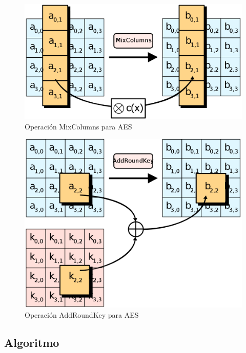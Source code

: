 \begin{figure}[ht]
  \centering
  \includegraphics[scale=0.25]{Figures/MixColumns}
  \decoRule
  \caption[MixColumns (AES)]{Operación MixColumns para AES \emph{\parencite{Reference29}}}
  \label{fig:MixColumns}
\end{figure}

\begin{figure}[ht]
  \centering
  \includegraphics[scale=0.25]{Figures/AddRoundKey}
  \decoRule
  \caption[AddRoundKey (AES)]{Operación AddRoundKey para AES \emph{\parencite{Reference30}}}
  \label{fig:AddRoundKey}
\end{figure}

\emph{\parencite{Reference26}}

\subsection{Algoritmo}

